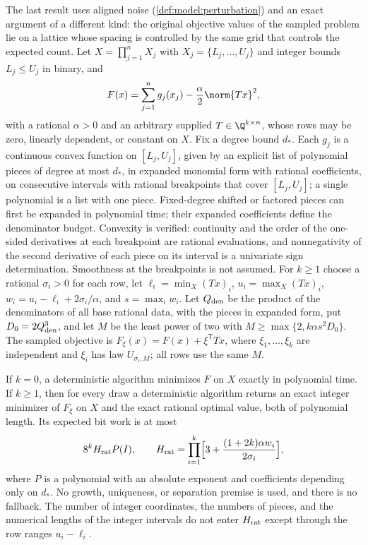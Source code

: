 The last result uses aligned noise (\cref{def:model:perturbation}) and an exact
argument of a different kind: the original objective values of the sampled
problem lie on a lattice whose spacing is controlled by the same grid that
controls the expected count. Let $X=\prod_{j=1}^nX_j$ with
$X_j=\{L_j,\ldots,U_j\}$ and integer bounds $L_j\le U_j$ in binary, and
\begin{equation}\label{eq:int:lowrank-model}
 F(x)=\sum_{j=1}^ng_j(x_j)-\frac\alpha2\norm{Tx}^2,
\end{equation}
with a rational $\alpha>0$ and an arbitrary supplied $T\in\Q^{k\times n}$,
whose rows may be zero, linearly dependent, or constant on $X$. Fix a degree
bound $d_*$. Each $g_j$ is a continuous convex function on $[L_j,U_j]$, given
by an explicit list of polynomial pieces of degree at most $d_*$, in expanded
monomial form with rational coefficients, on consecutive intervals with
rational breakpoints that cover $[L_j,U_j]$; a single polynomial is a list with
one piece. Fixed-degree shifted or factored pieces can first be expanded in
polynomial time; their expanded coefficients define the denominator budget.
Convexity is verified: continuity and the order of the one-sided
derivatives at each breakpoint are rational evaluations, and nonnegativity of
the second derivative of each piece on its interval is a univariate sign
determination. Smoothness at the breakpoints is not assumed. For $k\ge1$
choose a rational $\sigma_i>0$ for each row, let $\ell_i=\min_X(Tx)_i$,
$u_i=\max_X(Tx)_i$, $w_i=u_i-\ell_i+2\sigma_i/\alpha$, and $s=\max_iw_i$. Let
$Q_{\rm den}$ be the product of the denominators of all base rational data,
with the pieces in expanded form, put $D_0=2Q_{\rm den}^3$, and let $M$ be the
least power of two with $M\ge\max\{2,k\alpha s^2D_0\}$. The sampled objective
is $F_\xi(x)=F(x)+\xi^{\mathsf T}Tx$, where $\xi_1,\ldots,\xi_k$ are
independent and $\xi_i$ has law $U_{\sigma_i,M}$; all rows use the same $M$.

\begin{theorem}\label{thm:int:lowrank}
If $k=0$, a deterministic algorithm minimizes $F$ on $X$ exactly in
polynomial time. If $k\ge1$, then for every draw a deterministic algorithm
returns an exact integer minimizer of $F_\xi$ on $X$ and the exact rational
optimal value, both of polynomial length. Its expected bit work is at most
\[
 8^kH_{\rm rat}P(I),\qquad
 H_{\rm rat}=\prod_{i=1}^k\Bigl[3+\frac{(1+2k)\alpha w_i}{2\sigma_i}\Bigr],
\]
where $P$ is a polynomial with an absolute exponent and coefficients
depending only on $d_*$. No growth, uniqueness, or separation premise is
used, and there is no fallback. The number of integer coordinates, the
numbers of pieces, and the numerical lengths of the integer intervals do not
enter $H_{\rm rat}$ except through the row ranges $u_i-\ell_i$.
\end{theorem}

